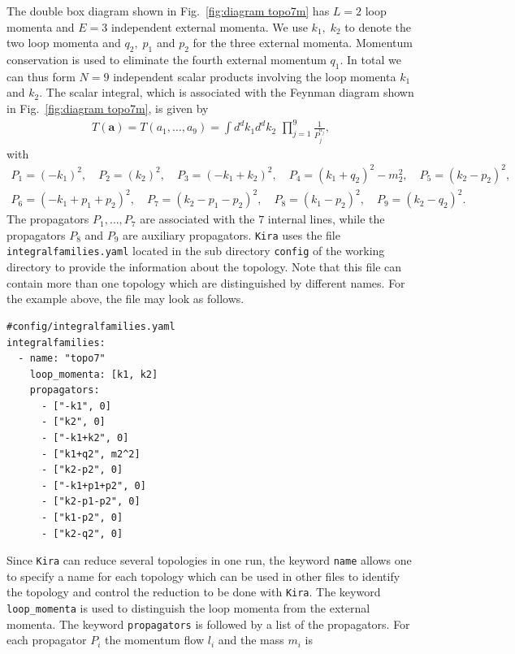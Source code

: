 \documentclass[a4paper,12pt]{scrartcl}
\newcommand*{\bm}{\boldsymbol}
\newcommand*{\kira}{\texttt{Kira}}
\def\Fig#1{{Fig.~\ref{#1}}}
\begin{document}
The double box diagram shown in \Fig{fig:diagram topo7m} has
$L=2$ loop momenta and $E=3$ independent external momenta. We use
$k_{1},\;k_{2}$ to denote the two loop momenta and $q_{2},\;p_{1}$ and
$p_{2}$ for the three external momenta.
Momentum conservation is used to eliminate the fourth external
momentum $q_{1}$. In total we can
thus form $N=9$ independent scalar products involving the loop momenta
$k_1$ and $k_2$.
The scalar integral, which is associated with the
Feynman diagram shown in \Fig{fig:diagram topo7m}, is given by
\begin{align}
  T(\bm{a})=T(a_{1},\dots,a_{9})
  =\int
    d^{d}k_{1}d^{d}k_{2} \,\,\prod\limits^{9}_{j=1}\frac{1}{P_{j}^{a_{j}}},
  \label{eq:Beispiel1}
\end{align}
with
\begin{eqnarray}
  P_{1} = (-k_{1})^{2},\quad P_{2}=(k_{2})^{2},\quad
  P_{3}=(-k_{1}+k_{2})^{2},\quad
  P_{4}=(k_{1}+q_{2})^{2}-m_{2}^{2},\quad
  P_{5}=(k_{2}-p_{2})^{2},\nonumber \\
  P_{6}=(-k_{1}+p_{1}+p_{2})^{2},\quad
  P_{7}=(k_{2}-p_{1}-p_{2})^{2},\quad
  P_{8}=(k_{1}-p_{2})^{2},\quad
  P_{9}=(k_{2}-q_{2})^{2}.
  \label{eq:topo7}
\end{eqnarray}
The propagators $P_{1},\dots,P_{7}$ are associated with the $7$
internal lines, while the propagators $P_{8}$ and $P_{9}$ are
auxiliary propagators.
\kira{} uses the file \texttt{integralfamilies.yaml} located in the sub
directory
\texttt{config} of the working directory to provide the information
about the topology. Note that this file can contain more than one topology
which are distinguished by different names. For the example above, the file may look as follows.
\begin{verbatim}
#config/integralfamilies.yaml
integralfamilies:
  - name: "topo7"
    loop_momenta: [k1, k2]
    propagators:
      - ["-k1", 0]
      - ["k2", 0]
      - ["-k1+k2", 0]
      - ["k1+q2", m2^2]
      - ["k2-p2", 0]
      - ["-k1+p1+p2", 0]
      - ["k2-p1-p2", 0]
      - ["k1-p2", 0]
      - ["k2-q2", 0]
\end{verbatim}
Since \kira{} can reduce several topologies in one run, the keyword
\texttt{name} allows one to specify a name for each topology which can be
used in other files to identify the topology and control the reduction
to be done with \kira{}. The keyword \texttt{loop\_momenta} is used to
distinguish the loop momenta from the external momenta.
The keyword
\texttt{propagators} is followed by a list of the propagators. For
each propagator $P_i$ the momentum flow $l_i$ and the mass $m_i$ is
\end{document}
